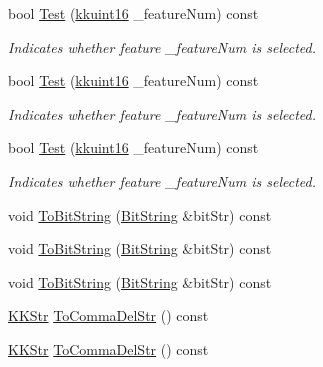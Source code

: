 \begin{DoxyCompactItemize}
bool \hyperlink{class_k_k_m_l_l_1_1_feature_num_list_a41840c60526332199ab26ab4e72ac7fd}{Test} (\hyperlink{namespace_k_k_b_aa8c7d4d30381c8a0b6fce68974a9c8a9}{kkuint16} \+\_\+feature\+Num) const 
\begin{DoxyCompactList}\small\item\em Indicates whether feature \textquotesingle{}\+\_\+feature\+Num\textquotesingle{} is selected. \end{DoxyCompactList}\item 
bool \hyperlink{class_k_k_m_l_l_1_1_feature_num_list_a2bbbcaf897e67772eed8476738fe7efd}{Test} (\hyperlink{namespace_k_k_b_aa8c7d4d30381c8a0b6fce68974a9c8a9}{kkuint16} \+\_\+feature\+Num) const 
\begin{DoxyCompactList}\small\item\em Indicates whether feature \textquotesingle{}\+\_\+feature\+Num\textquotesingle{} is selected. \end{DoxyCompactList}\item 
bool \hyperlink{class_k_k_m_l_l_1_1_feature_num_list_a41840c60526332199ab26ab4e72ac7fd}{Test} (\hyperlink{namespace_k_k_b_aa8c7d4d30381c8a0b6fce68974a9c8a9}{kkuint16} \+\_\+feature\+Num) const 
\begin{DoxyCompactList}\small\item\em Indicates whether feature \textquotesingle{}\+\_\+feature\+Num\textquotesingle{} is selected. \end{DoxyCompactList}\item 
void \hyperlink{class_k_k_m_l_l_1_1_feature_num_list_a88e03458334d0492379d0e5ed5de86de}{To\+Bit\+String} (\hyperlink{class_k_k_b_1_1_bit_string}{Bit\+String} \&bit\+Str) const 
\item 
void \hyperlink{class_k_k_m_l_l_1_1_feature_num_list_a50042bf8f3dbb293cd53d88714df38b0}{To\+Bit\+String} (\hyperlink{class_k_k_b_1_1_bit_string}{Bit\+String} \&bit\+Str) const 
\item 
void \hyperlink{class_k_k_m_l_l_1_1_feature_num_list_a88e03458334d0492379d0e5ed5de86de}{To\+Bit\+String} (\hyperlink{class_k_k_b_1_1_bit_string}{Bit\+String} \&bit\+Str) const 
\item 
\hyperlink{class_k_k_b_1_1_k_k_str}{K\+K\+Str} \hyperlink{class_k_k_m_l_l_1_1_feature_num_list_abfd2d7bc9db5133fbe02577f1d82891c}{To\+Comma\+Del\+Str} () const 
\item 
\hyperlink{class_k_k_b_1_1_k_k_str}{K\+K\+Str} \hyperlink{class_k_k_m_l_l_1_1_feature_num_list_abfd2d7bc9db5133fbe02577f1d82891c}{To\+Comma\+Del\+Str} () const 
\item 

\end{DoxyCompactItemize}
